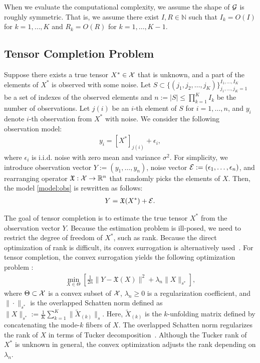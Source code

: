 When we evaluate the computational complexity, we assume the shape of
$\mathcal{G}$ is roughly symmetric. That is, we assume there exist
$I,R\in\mathbb{N}$ such that $I_k=O(I)$ for $k=1,\dots,K$ and
$R_k=O(R)$ for $k=1,\dots,K-1$.


\subsection{Tensor Completion Problem}

Suppose there exists a true tensor $X^* \in \mathcal{X}$ that is unknown, and
a part of the elements of $X^*$ is observed with some noise.  Let
$S \subset \{(j_1,j_2,
\ldots,j_K)\}_{j_1,\ldots,j_K=1}^{I_1,\ldots,I_K}$
be a set of indexes of the observed elements and
$n := |S| \leq \prod_{k=1}^K I_k$ be the number of observations.  Let
$j(i)$ be an $i$-th element of $S$ for $i=1,\ldots,n$, and $y_i$
denote $i$-th observation from $X^*$ with noise.  We consider the
following observation model:
\begin{align}
	y_i = [X^*]_{j(i)} + \epsilon_i, \label{model:obs}
\end{align}
where $\epsilon_i$ is i.i.d. noise with zero mean and variance
$\sigma^2$.  For simplicity, we introduce  observation vector
$Y := (y_1, \ldots, y_n)$, noise vector
$\mathcal{E} := (\epsilon_1, \ldots , \epsilon_n)$, and rearranging operator
$\mathfrak{X} : \mathcal{X} \to \mathbb{R}^n$ that randomly picks the elements of $X$.
Then, the model \eqref{model:obs} is rewritten as follows:
\begin{align*}
	Y = \mathfrak{X}(X^*) + \mathcal{E}.
\end{align*}

The goal of tensor completion is to estimate the true tensor $X^*$
from the observation vector $Y$.  Because the estimation problem is
ill-posed, we need to restrict the degree of freedom of $X^*$, such as
rank. Because the direct optimization of rank is difficult, its convex
surrogation is alternatively
used~\cite{candes2012exact,candes2010matrix, krishnamurthy2013low,
  zhang2016exact, phien2016efficient}.  For tensor
completion, the convex surrogation yields the following optimization
problem
\cite{gandy2011tensor,liu2013tensor,signoretto2011tensor,tomioka2010estimation}:
\begin{align}
	\min_{X \in \Theta} \left[ \frac{1}{2n} \|Y - \mathfrak{X}(X)\|^2 + \lambda_n \|X\|_{s^*} \right], \label{opt:general}
\end{align}
where $\Theta \subset \mathcal{X}$ is a convex subset of $\mathcal{X}$, 
$\lambda_n\geq 0$ is a regularization coefficient, and
$ \|\cdot\|_{s^*}$ is the overlapped Schatten norm defined as
$ \|X\|_{s^*} := \frac{1}{K} \sum_{k=1}^K \|\tilde{X}_{(k)}\|_s$.
Here, $\tilde{X}_{(k)}$ is the $k$-unfolding matrix defined by
concatenating the mode-$k$ fibers of $X$.  The overlapped Schatten
norm regularizes the rank of $X$ in terms of Tucker
decomposition~\cite{negahban2011estimation, tomioka2011statistical}.
Although the Tucker rank of $X^*$ is unknown in general, the convex
optimization adjusts the rank depending on $\lambda_n$.

